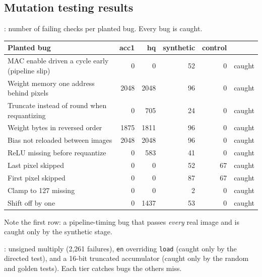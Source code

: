 \documentclass[11pt]{article}
\begin{document}
\subsection{Mutation testing results}
\textbf{}: number of failing checks per planted bug. Every bug is caught.
\begin{center}
\begin{tabular}{@{}lrrrrl@{}}
\toprule
Planted bug & acc1 & hq & synthetic & control & \\
\midrule
MAC enable driven a cycle early (pipeline slip)   & 0    & 0    & 52 & 0  & caught \\
Weight memory one address behind pixels           & 2048 & 2048 & 96 & 0  & caught \\
Truncate instead of round when requantizing       & 0    & 705  & 24 & 0  & caught \\
Weight bytes in reversed order                    & 1875 & 1811 & 96 & 0  & caught \\
Bias not reloaded between images                  & 2048 & 2048 & 96 & 0  & caught \\
ReLU missing before requantize                    & 0    & 583  & 41 & 0  & caught \\
Last pixel skipped                                & 0    & 0    & 52 & 67 & caught \\
First pixel skipped                               & 0    & 0    & 87 & 67 & caught \\
Clamp to 127 missing                              & 0    & 0    & 2  & 0  & caught \\
Shift off by one                                  & 0    & 1437 & 53 & 0  & caught \\
\bottomrule
\end{tabular}
\end{center}
Note the first row: a pipeline-timing bug that passes \emph{every} real image and
is caught only by the synthetic stage.

\textbf{}: unsigned multiply (2{,}261 failures), \texttt{en}
overriding \texttt{load} (caught only by the directed test), and a 16-bit
truncated accumulator (caught only by the random and golden tests). Each tier
catches bugs the others miss.
\end{document}

